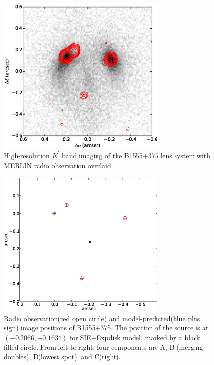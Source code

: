 \documentclass[useAMS,usenatbib]{mn2e}
\begin{document}
\begin{figure}
\includegraphics[width=84mm]{1555_ao_merlin_overlay.eps}
\caption{High-resolution  $K^\prime$ band imaging of the B1555+375 lens system with MERLIN radio observation overlaid.
%
\label{fig:merlin}}
\end{figure}


\begin{figure}
\includegraphics[width=84mm]{point_source.eps}
\caption{Radio observation(red open circle) and model-predicted(blue plus sign) image positions of B1555+375. The position of the source is at $(-0.2066,-0.1634)$ for SIE+Expdisk model, marked by a black filled circle. From left to right, four components are A, B (merging doubles), D(lowest spot), and C(right).\label{fig2}}
\end{figure}
\end{document}
